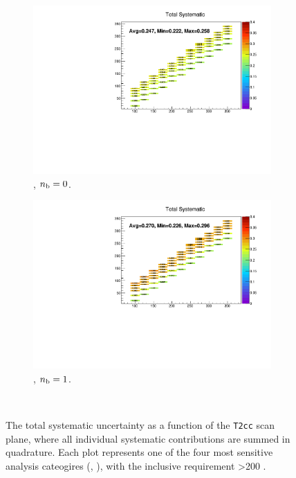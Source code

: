 \begin{figure}[h!]
\begin{subfigure}[b]{0.47\textwidth}
    \includegraphics[width=\textwidth]{Figs/sms/t2cc/v37_2/systs/total_T2cc_eq0b_ge4j_incl.pdf}
    \caption{\njhigh, $n_{\text{b}} = 0$.}
  \end{subfigure}
  \begin{subfigure}[b]{0.47\textwidth}
    \includegraphics[width=\textwidth]{Figs/sms/t2cc/v37_2/systs/total_T2cc_eq1b_ge4j_incl.pdf}
    \caption{\njhigh, $n_{\text{b}} = 1$.}
  \end{subfigure}\\
  \caption{The total systematic uncertainty as a function of the \texttt{T2cc} scan plane,
  where all individual systematic contributions are summed in quadrature.
  Each plot represents one of the four most sensitive 
  analysis cateogires (\nb, \nj), with the inclusive requirement \HT>200 \gev.}
  \label{fig:sms-totalsyst-t2cc}
\end{figure}

